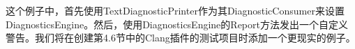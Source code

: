 这个例子中，首先使用TextDiagnosticPrinter作为其DiagnosticConsumer来设置DiagnosticsEngine。然后，使用DiagnosticsEngine的Report方法发出一个自定义警告。我们将在创建第4.6节中的Clang插件的测试项目时添加一个更现实的例子。

























































